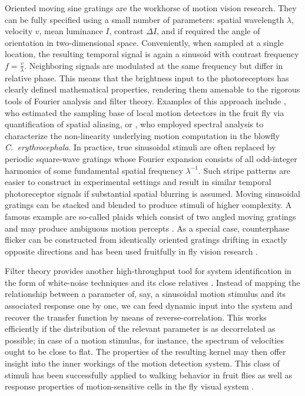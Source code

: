 Oriented moving sine gratings are the workhorse of motion vision research. They can be fully specified using a small number of parameters: spatial wavelength $\lambda$, velocity $v$, mean luminance $I$, contrast $\Delta I$, and if required the angle of orientation in two-dimensional space. Conveniently, when sampled at a single location, the resulting temporal signal is again a sinusoid with contrast frequency $f = \frac{v}{\lambda}$. Neighboring signals are modulated at the same frequency but differ in relative phase. This means that the brightness input to the photoreceptors has clearly defined mathematical properties, rendering them amenable to the rigorous tools of Fourier analysis and filter theory. Examples of this approach include \citet{Gotz:1964bj}, who estimated the sampling base of local motion detectors in the fruit fly via quantification of spatial aliasing, or \citet{Egelhaaf:1989wf}, who employed spectral analysis to characterize the non-linearity underlying motion computation in the blowfly \textit{C.\ erythrocephala}. In practice, true sinusoidal stimuli are often replaced by periodic square-wave gratings whose Fourier expansion consists of all odd-integer harmonics of some fundamental spatial frequency $\lambda^{-1}$. Such stripe patterns are easier to construct in experimental settings and result in similar temporal photoreceptor signals if substantial spatial blurring is assumed. Moving sinusoidal gratings can be stacked and blended to produce stimuli of higher complexity. A famous example are so-called plaids which consist of two angled moving gratings and may produce ambiguous motion percepts \citep{Adelson:1982aa}. As a special case, counterphase flicker can be constructed from identically oriented gratings drifting in exactly opposite directions and has been used fruitfully in fly vision research \citep{Bahl:2015cqa}.

Filter theory provides another high-throughput tool for system identification in the form of white-noise techniques and its close relatives \citep{Dayan:2001aa}. Instead of mapping the relationship between a parameter of, say, a sinusoidal motion stimulus and its associated response one by one, we can feed dynamic input into the system and recover the transfer function by means of reverse-correlation. This works efficiently if the distribution of the relevant parameter is as decorrelated as possible; in case of a motion stimulus, for instance, the spectrum of velocities ought to be close to flat. The properties of the resulting kernel may then offer insight into the inner workings of the motion detection system. This class of stimuli has been successfully applied to walking behavior in fruit flies \citep{Theobald:2010dt,Aptekar:2013iv} as well as response properties of motion-sensitive cells in the fly visual system \citep{Borst:2005dr,Weber:2010ic}.

